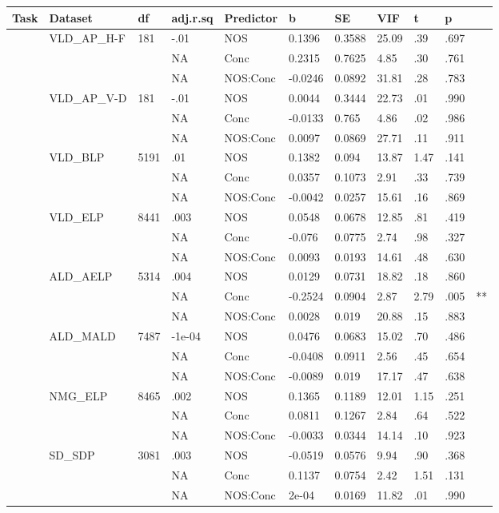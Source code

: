 \begin{table}[ht]
\centering
\begingroup\normalsize
\begin{tabular}{lllllllllll}
  \hline
Task & Dataset & df & adj.r.sq & Predictor & b & SE & VIF & t & p &  \\ 
  \hline
 & VLD\_AP\_H-F & 181 & -.01 & NOS & 0.1396 & 0.3588 & 25.09 & .39 & .697 &   \\ 
   &  &  & NA & Conc & 0.2315 & 0.7625 & 4.85 & .30 & .761 &   \\ 
   &  &  & NA & NOS:Conc & -0.0246 & 0.0892 & 31.81 & .28 & .783 &   \\ 
   & VLD\_AP\_V-D & 181 & -.01 & NOS & 0.0044 & 0.3444 & 22.73 & .01 & .990 &   \\ 
   &  &  & NA & Conc & -0.0133 & 0.765 & 4.86 & .02 & .986 &   \\ 
   &  &  & NA & NOS:Conc & 0.0097 & 0.0869 & 27.71 & .11 & .911 &   \\ 
   & VLD\_BLP & 5191 & .01 & NOS & 0.1382 & 0.094 & 13.87 & 1.47 & .141 &   \\ 
   &  &  & NA & Conc & 0.0357 & 0.1073 & 2.91 & .33 & .739 &   \\ 
   &  &  & NA & NOS:Conc & -0.0042 & 0.0257 & 15.61 & .16 & .869 &   \\ 
   & VLD\_ELP & 8441 & .003 & NOS & 0.0548 & 0.0678 & 12.85 & .81 & .419 &   \\ 
   &  &  & NA & Conc & -0.076 & 0.0775 & 2.74 & .98 & .327 &   \\ 
   &  &  & NA & NOS:Conc & 0.0093 & 0.0193 & 14.61 & .48 & .630 &   \\ 
   & ALD\_AELP & 5314 & .004 & NOS & 0.0129 & 0.0731 & 18.82 & .18 & .860 &   \\ 
   &  &  & NA & Conc & -0.2524 & 0.0904 & 2.87 & 2.79 & .005 & ** \\ 
   &  &  & NA & NOS:Conc & 0.0028 & 0.019 & 20.88 & .15 & .883 &   \\ 
   & ALD\_MALD & 7487 & -1e-04 & NOS & 0.0476 & 0.0683 & 15.02 & .70 & .486 &   \\ 
   &  &  & NA & Conc & -0.0408 & 0.0911 & 2.56 & .45 & .654 &   \\ 
   &  &  & NA & NOS:Conc & -0.0089 & 0.019 & 17.17 & .47 & .638 &   \\ 
   & NMG\_ELP & 8465 & .002 & NOS & 0.1365 & 0.1189 & 12.01 & 1.15 & .251 &   \\ 
   &  &  & NA & Conc & 0.0811 & 0.1267 & 2.84 & .64 & .522 &   \\ 
   &  &  & NA & NOS:Conc & -0.0033 & 0.0344 & 14.14 & .10 & .923 &   \\ 
   & SD\_SDP & 3081 & .003 & NOS & -0.0519 & 0.0576 & 9.94 & .90 & .368 &   \\ 
   &  &  & NA & Conc & 0.1137 & 0.0754 & 2.42 & 1.51 & .131 &   \\ 
   &  &  & NA & NOS:Conc & 2e-04 & 0.0169 & 11.82 & .01 & .990 &   \\ 
   \hline
\end{tabular}
\endgroup
\end{table}
